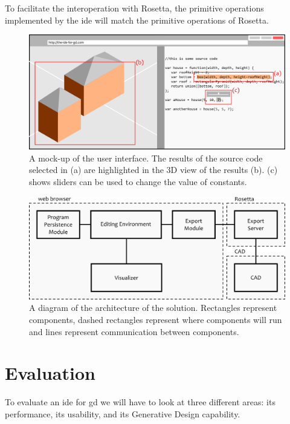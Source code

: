 \documentclass{./llncs2e/llncs}
\begin{document}
	To facilitate the interoperation with Rosetta, the primitive operations implemented by the \ac{ide} will match the primitive operations of Rosetta.
	
	
	\begin{figure}
		\centering
		\includegraphics[width=1.0\textwidth]{img/ui_mock}
		\caption{A mock-up of the user interface. The results of the source code selected in (a) are highlighted in the 3D view of the results (b). (c) shows sliders can be used to change the value of constants.}
		\label{fig:ui:mock}
	\end{figure}
	
	\begin{figure}
		\centering
		\includegraphics[width=1.0\textwidth]{img/gen_sol}
		\caption{A diagram of the architecture of the solution. Rectangles represent components, dashed rectangles represent where components will run and lines represent communication between components.}
		\label{fig:gen:sol}
	\end{figure}
	

\section{Evaluation}
	To evaluate an \ac{ide} for \ac{gd} we will have to look at three different areas:
	its performance, its usability, and its Generative Design capability.
	
\end{document}
